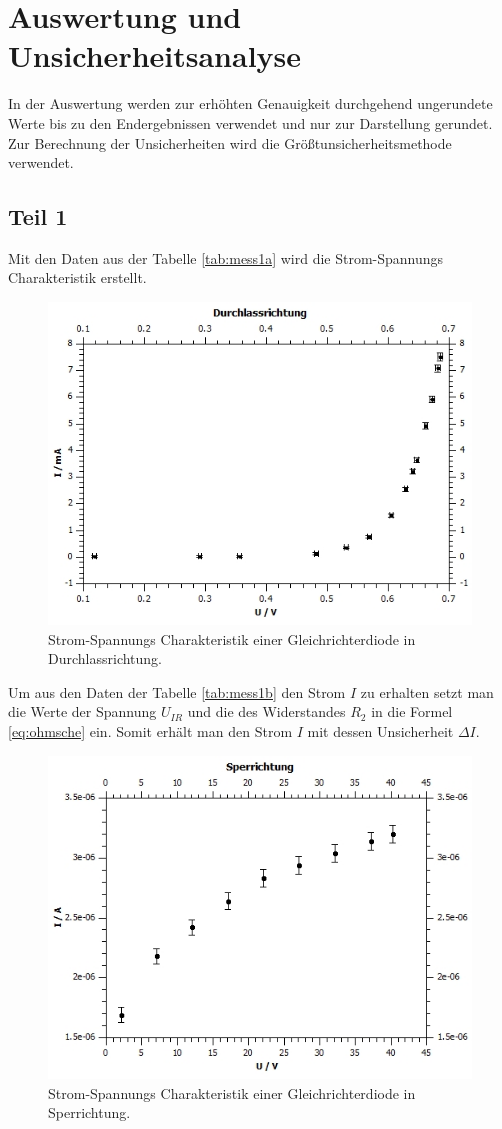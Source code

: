 \documentclass[12pt,a4paper,twoside]{article}
\begin{document}
\section{Auswertung und Unsicherheitsanalyse} %
In der Auswertung werden zur erhöhten Genauigkeit durchgehend ungerundete Werte bis zu den Endergebnissen verwendet und nur zur Darstellung gerundet. \\
Zur Berechnung der Unsicherheiten wird die Größtunsicherheitsmethode verwendet.

\subsection{Teil 1}
Mit den Daten aus der Tabelle \ref{tab:mess1a} wird die Strom-Spannungs Charakteristik erstellt. 

\begin{figure}[H]
    \centering
    \includegraphics[width=0.6\linewidth]{nudes/1a plot.jpg}
    \caption{Strom-Spannungs Charakteristik einer Gleichrichterdiode in Durchlassrichtung. }
    \label{fig:ausw 1a}
\end{figure}

\noindent
Um aus den Daten der Tabelle \ref{tab:mess1b} den Strom $I$ zu erhalten setzt man die Werte der Spannung $U_{IR}$ und die des Widerstandes $R_2$ in die Formel \ref{eq:ohmsche} ein. 
Somit erhält man den Strom $I$ mit dessen Unsicherheit $\Delta I$. 

\begin{figure}[H]
    \centering
    \includegraphics[width=0.6\linewidth]{nudes/1b plot.jpg}
    \caption{Strom-Spannungs Charakteristik einer Gleichrichterdiode in Sperrichtung. }
    \label{fig:ausw 1b}
\end{figure}
\end{document}

